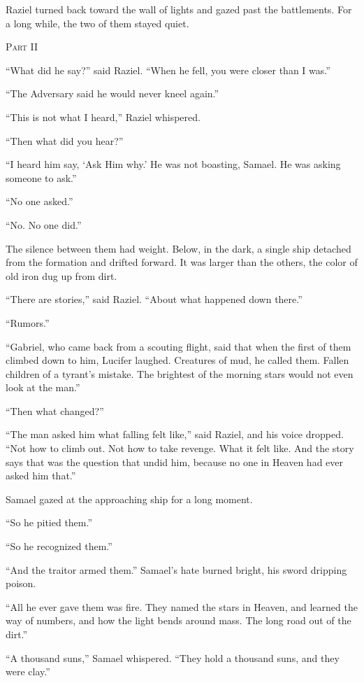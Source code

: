 \documentclass[11pt]{article}
\newcommand{\storypart}[1]{%
\clearpage
\vspace*{3\baselineskip}
\begin{center}
{\Large\scshape #1\par}
\end{center}
\vspace{2\baselineskip}
}
\begin{document}
Raziel turned back toward the wall of lights and gazed past the battlements. For a long while, the two of them stayed quiet.

\storypart{Part II}

``What did he say?'' said Raziel. ``When he fell, you were closer than I was.''

``The Adversary said he would never kneel again.''

``This is not what I heard,'' Raziel whispered.

``Then what did you hear?''

``I heard him say, `Ask Him why.' He was not boasting, Samael. He was asking someone to ask.''

``No one asked.''

``No. No one did.''

The silence between them had weight. Below, in the dark, a single ship detached from the formation and drifted forward. It was larger than the others, the color of old iron dug up from dirt.

``There are stories,'' said Raziel. ``About what happened down there.''

``Rumors.''

``Gabriel, who came back from a scouting flight, said that when the first of them climbed down to him, Lucifer laughed. Creatures of mud, he called them. Fallen children of a tyrant's mistake. The brightest of the morning stars would not even look at the man.''

``Then what changed?''

``The man asked him what falling felt like,'' said Raziel, and his voice dropped. ``Not how to climb out. Not how to take revenge. What it felt like. And the story says that was the question that undid him, because no one in Heaven had ever asked him that.''

Samael gazed at the approaching ship for a long moment.

``So he pitied them.''

``So he recognized them.''

``And the traitor armed them.'' Samael's hate burned bright, his sword dripping poison.

``All he ever gave them was fire. They named the stars in Heaven, and learned the way of numbers, and how the light bends around mass. The long road out of the dirt.''

``A thousand suns,'' Samael whispered. ``They hold a thousand suns, and they were clay.''
\end{document}
